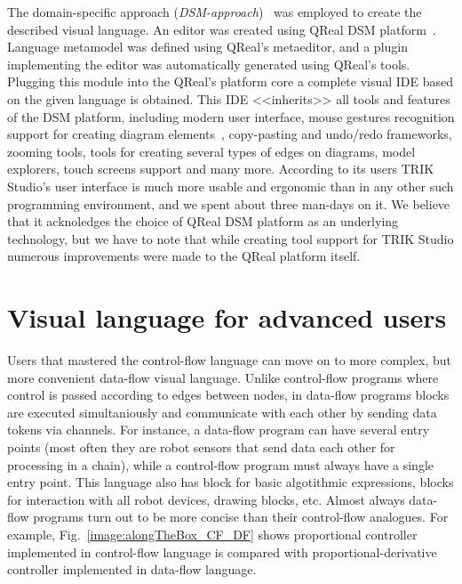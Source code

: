 \documentclass[conference]{IEEEtran}
\begin{document}
The domain-specific approach (\textit{DSM-approach})~\cite{koznov2008} was employed to create the described visual language. An editor was created using QReal DSM platform~\cite{qrealMeta,kuzenkova2013qreal}.  Language metamodel was defined using QReal's metaeditor, and a plugin implementing the editor was automatically generated using QReal's tools. Plugging this module into the QReal's platform core a complete visual IDE based on the given language is obtained. This IDE <<inherits>> all tools and features of the DSM platform, including modern user interface, mouse gestures recognition support for creating diagram elements~\cite{osechkina2010gestures,osechkina2012multistroke}, copy-pasting and undo/redo frameworks, zooming tools, tools for creating several types of edges on diagrams, model explorers, touch screens support and many more. According to its users TRIK Studio's user interface is much more usable and ergonomic than in any other such programming environment, and we spent about three man-days on it. We believe that it acknoledges the choice of QReal DSM platform as an underlying technology, but we have to note that while creating tool support for TRIK Studio numerous improvements were made to the QReal platform itself.

\section{Visual language for advanced users}
\label{chapter:dataFlowLanguage}

Users that mastered the control-flow language can move on to more complex, but more convenient data-flow visual language. Unlike control-flow programs where control is passed according to edges between nodes, in data-flow programs blocks are executed simultaniously and communicate with each other by sending data tokens via channels. For instance, a data-flow program can have several entry points (most often they are robot sensors that send data each other for processing in a chain), while a control-flow program must always have a single entry point. This language also has block for basic algotithmic expressions, blocks for interaction with all robot devices, drawing blocks, etc. Almost always data-flow programs turn out to be more concise than their control-flow analogues. For example, Fig.~\ref{image:alongTheBox_CF_DF} shows proportional controller implemented in control-flow language is compared with proportional-derivative controller implemented in data-flow language.
\end{document}
